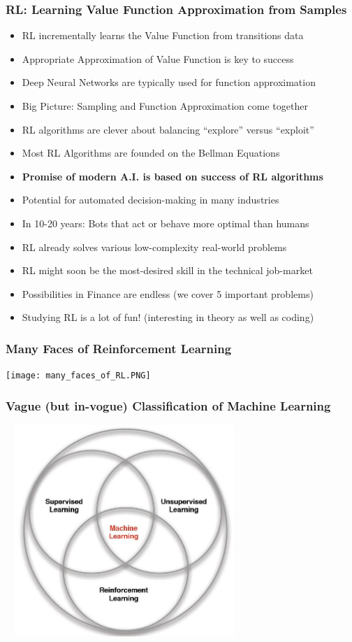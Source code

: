 \documentclass[handout]{beamer}
\begin{document}
\begin{frame}
\frametitle{RL: Learning Value Function Approximation from Samples}
\pause
\begin{itemize}[<+->]
\item RL incrementally learns the Value Function from transitions data
\item Appropriate Approximation of Value Function is key to success
\item Deep Neural Networks are typically used for function approximation
\item Big Picture: Sampling and Function Approximation come together
\item RL algorithms are clever about balancing  ``explore'' versus ``exploit''
\item Most RL Algorithms are founded on the Bellman Equations
\item {\bf Promise of modern A.I. is based on success of RL algorithms}
\item Potential for automated decision-making in many industries
\item In 10-20 years: Bots that act or behave more optimal than humans
\item RL already solves various low-complexity real-world problems
\item RL might soon be the most-desired skill in the technical job-market
\item Possibilities in Finance are endless (we cover 5 important problems)
\item Studying RL is a lot of fun! (interesting in theory as well as coding)
\end{itemize}
\end{frame}


\begin{frame}
\frametitle{Many Faces of Reinforcement Learning}
\texttt{[image: many\_faces\_of\_RL.PNG]}
\end{frame}

\begin{frame}
\frametitle{Vague (but in-vogue) Classification of Machine Learning}
\includegraphics[width=9cm, height=8cm]{MLBranches.PNG}
\end{frame}
\end{document}
